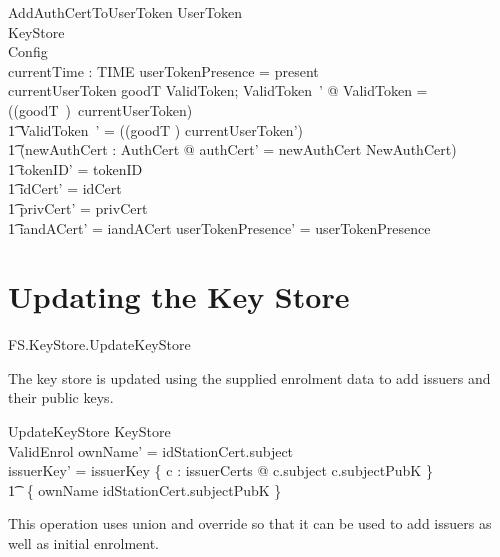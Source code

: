 \begin{schema}{AddAuthCertToUserToken}
        \Delta UserToken
\\      KeyStore
\\      Config
\\      currentTime : TIME
\where
        userTokenPresence = present
\\      currentUserToken \in \ran goodT
\also
      \exists ValidToken; ValidToken~' @ \theta ValidToken = ((goodT~\inv)~currentUserToken) 
\\ \t1  \land \theta ValidToken~' = ((goodT \inv) currentUserToken')
\\ \t1  \land (\exists newAuthCert : AuthCert @ \The authCert' = newAuthCert
        \land NewAuthCert)
\\ \t1  \land tokenID' = tokenID
\\ \t1  \land idCert' = idCert
\\ \t1  \land privCert' = privCert
\\ \t1  \land iandACert' = iandACert
\also
        userTokenPresence' = userTokenPresence
\end{schema}


\section{Updating the Key Store}

\begin{traceunit}{FS.KeyStore.UpdateKeyStore}
\end{traceunit}


The key store is updated using the supplied enrolment data 
to add issuers and their public keys.

\begin{schema}{UpdateKeyStore}
        \Delta KeyStore
\\      ValidEnrol
\where
        \The ownName' = idStationCert.subject
\\      issuerKey' = issuerKey \oplus\{ c : issuerCerts @ c.subject \mapsto c.subjectPubK
        \}
\\      \t1     \oplus ~\{ \The ownName \mapsto idStationCert.subjectPubK \} 
\end{schema}
\begin{Zcomment}
\item
This operation uses union and override so that it can be used to add
issuers as well as initial enrolment. 
\end{Zcomment}

